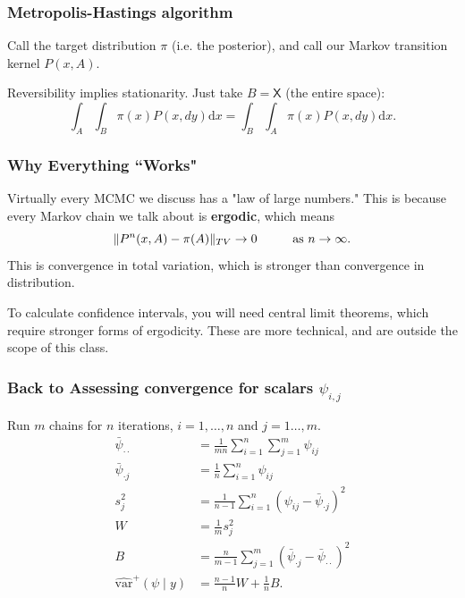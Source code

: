 \documentclass{beamer}
\begin{document}
\begin{frame}
\frametitle{Metropolis-Hastings algorithm}

Call the target distribution $\pi$ (i.e. the posterior), and call our Markov transition kernel $P(x, A)$.
\newline

Reversibility implies stationarity. Just take $B = \mathsf{X}$ (the entire space):
$$
\int_A\int_B \pi(x) P(x, dy) \text{d}x = \int_B\int_A \pi(x) P(x, dy) \text{d}x.
$$

\end{frame}

\begin{frame}
\frametitle{Why Everything ``Works"}

Virtually every MCMC we discuss has a "law of large numbers." This is because every Markov chain we talk about is {\bf ergodic}, which means 
$$
\Vert P^n(x,A)- \pi(A) \Vert_{TV} \to 0 \hspace{10mm} \text{as } n \to \infty.
$$
This is convergence in total variation, which is stronger than convergence in distribution.
\newline

To calculate confidence intervals, you will need central limit theorems, which require stronger forms of ergodicity. These are more technical, and are outside the scope of this class.




\end{frame}

\begin{frame}
\frametitle{Back to  Assessing convergence for scalars $\psi_{i,j}$}

Run $m$ chains for $n$ iterations, $i=1,\ldots,n$ and $j=1\ldots,m$.
\begin{align*}
\bar{\psi}_{\cdot \cdot} &= \frac{1}{mn}\sum_{i=1}^n\sum_{j=1}^m \psi_{ij} \tag{overall average} \\
\bar{\psi}_{\cdot j} &= \frac{1}{n}\sum_{i=1}^n \psi_{ij} \tag{chain average} \\
s^2_j &= \frac{1}{n-1}\sum_{i=1}^n (\psi_{ij}-\bar{\psi}_{\cdot j})^2 \tag{chain sd} \\
W &= \frac{1}{m} s^2_j \tag{within-sequence variance} \\
B &= \frac{n}{m-1} \sum_{j=1}^m (\bar{\psi}_{\cdot j} - \bar{\psi}_{\cdot \cdot})^2\\
\hat{\text{var}}^{+}(\psi \mid y) &=\frac{n-1}{n}W + \frac{1}{n}B.
\end{align*}

\end{frame}
\end{document}
